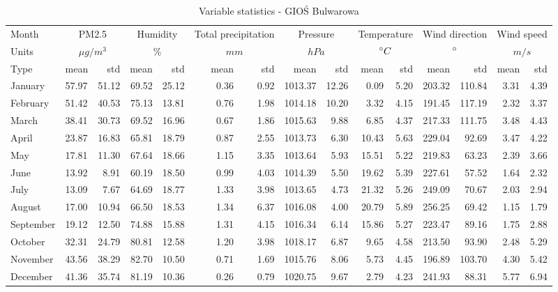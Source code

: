\begin{landscape}
\begin{table}[H]
\centering
\caption{Variable statistics - GIOŚ Bulwarowa}
\label{tab:dataset-stats-bulwarowa}
\footnotesize
\begin{tabular}{llrrrrrrrrrrrrr}
\hline
Month & \multicolumn{2}{c}{PM2.5} & \multicolumn{2}{c}{Humidity} & \multicolumn{2}{c}{Total precipitation} & \multicolumn{2}{c}{Pressure} & \multicolumn{2}{c}{Temperature} & \multicolumn{2}{c}{Wind direction} & \multicolumn{2}{c}{Wind speed} \\
Units & \multicolumn{2}{c}{$\mu g / m^3$} & \multicolumn{2}{c}{$\%$} & \multicolumn{2}{c}{$mm$} & \multicolumn{2}{c}{$hPa$} & \multicolumn{2}{c}{$\degree C$} & \multicolumn{2}{c}{$\degree$} & \multicolumn{2}{c}{$m/s$} \\
Type & mean & std & mean & std & mean & std & mean & std & mean & std & mean & std & mean & std \\ \hline

January & 57.97 & 51.12 & 69.52 & 25.12 & 0.36 & 0.92 & 1013.37 & 12.26 & 0.09 & 5.20 & 203.32 & 110.84 & 3.31 & 4.39 \\ 
February & 51.42 & 40.53 & 75.13 & 13.81 & 0.76 & 1.98 & 1014.18 & 10.20 & 3.32 & 4.15 & 191.45 & 117.19 & 2.32 & 3.37 \\ 
March & 38.41 & 30.73 & 69.52 & 16.96 & 0.67 & 1.86 & 1015.63 & 9.88 & 6.85 & 4.37 & 217.33 & 111.75 & 3.48 & 4.43 \\ 
April & 23.87 & 16.83 & 65.81 & 18.79 & 0.87 & 2.55 & 1013.73 & 6.30 & 10.43 & 5.63 & 229.04 & 92.69 & 3.47 & 4.22 \\ 
May & 17.81 & 11.30 & 67.64 & 18.66 & 1.15 & 3.35 & 1013.64 & 5.93 & 15.51 & 5.22 & 219.83 & 63.23 & 2.39 & 3.66 \\ 
June & 13.92 & 8.91 & 60.19 & 18.50 & 0.99 & 4.03 & 1014.39 & 5.50 & 19.62 & 5.39 & 227.61 & 57.52 & 1.64 & 2.32 \\ 
July & 13.09 & 7.67 & 64.69 & 18.77 & 1.33 & 3.98 & 1013.65 & 4.73 & 21.32 & 5.26 & 249.09 & 70.67 & 2.03 & 2.94 \\ 
August & 17.00 & 10.94 & 66.50 & 18.53 & 1.34 & 6.37 & 1016.08 & 4.00 & 20.79 & 5.89 & 256.25 & 69.42 & 1.15 & 1.79 \\ 
September & 19.12 & 12.50 & 74.88 & 15.88 & 1.31 & 4.15 & 1016.34 & 6.14 & 15.86 & 5.27 & 223.47 & 89.16 & 1.75 & 2.88 \\ 
October & 32.31 & 24.79 & 80.81 & 12.58 & 1.20 & 3.98 & 1018.17 & 6.87 & 9.65 & 4.58 & 213.50 & 93.90 & 2.48 & 5.29 \\ 
November & 43.56 & 38.29 & 82.70 & 10.50 & 0.71 & 1.69 & 1015.76 & 8.06 & 5.73 & 4.45 & 196.89 & 103.70 & 4.30 & 5.42 \\ 
December & 41.36 & 35.74 & 81.19 & 10.36 & 0.26 & 0.79 & 1020.75 & 9.67 & 2.79 & 4.23 & 241.93 & 88.31 & 5.77 & 6.94 \\ 
\bottomrule

\end{tabular}
\end{table}
\end{landscape}


